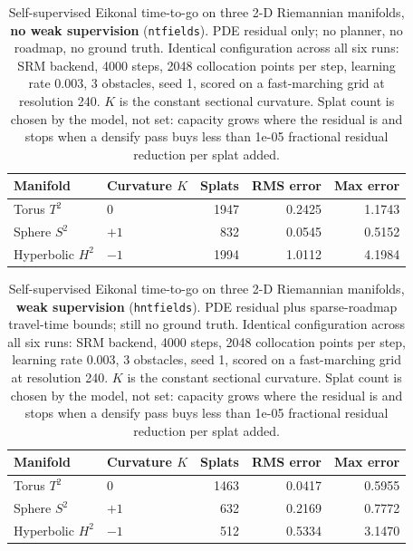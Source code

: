\begin{table}[t]
  \centering
  \begin{tabular}{llrrr}
    \toprule
    Manifold & Curvature $K$ & Splats & RMS error & Max error \\
    \midrule
    Torus $T^2$ & $0$ & 1947 & 0.2425 & 1.1743 \\
    Sphere $S^2$ & $+1$ & 832 & 0.0545 & 0.5152 \\
    Hyperbolic $H^2$ & $-1$ & 1994 & 1.0112 & 4.1984 \\
    \bottomrule
  \end{tabular}
  \caption{Self-supervised Eikonal time-to-go on three 2-D Riemannian manifolds, \textbf{no weak supervision} (\texttt{ntfields}). PDE residual only; no planner, no roadmap, no ground truth. Identical configuration across all six runs: SRM backend, 4000 steps, 2048 collocation points per step, learning rate 0.003, 3 obstacles, seed 1, scored on a fast-marching grid at resolution 240. $K$ is the constant sectional curvature. Splat count is chosen by the model, not set: capacity grows where the residual is and stops when a densify pass buys less than 1e-05 fractional residual reduction per splat added.}
  \label{tab:2d-final}
\end{table}

\begin{table}[t]
  \centering
  \begin{tabular}{llrrr}
    \toprule
    Manifold & Curvature $K$ & Splats & RMS error & Max error \\
    \midrule
    Torus $T^2$ & $0$ & 1463 & 0.0417 & 0.5955 \\
    Sphere $S^2$ & $+1$ & 632 & 0.2169 & 0.7772 \\
    Hyperbolic $H^2$ & $-1$ & 512 & 0.5334 & 3.1470 \\
    \bottomrule
  \end{tabular}
  \caption{Self-supervised Eikonal time-to-go on three 2-D Riemannian manifolds, \textbf{weak supervision} (\texttt{hntfields}). PDE residual plus sparse-roadmap travel-time bounds; still no ground truth. Identical configuration across all six runs: SRM backend, 4000 steps, 2048 collocation points per step, learning rate 0.003, 3 obstacles, seed 1, scored on a fast-marching grid at resolution 240. $K$ is the constant sectional curvature. Splat count is chosen by the model, not set: capacity grows where the residual is and stops when a densify pass buys less than 1e-05 fractional residual reduction per splat added.}
  \label{tab:2d-weak}
\end{table}
